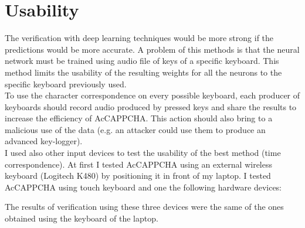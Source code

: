 \section{Usability}
The verification with deep learning techniques would be more strong if the predictions would be more accurate. A problem of this methods is that the neural network must be trained using audio file of keys of a specific keyboard. This method limits the usability of the resulting weights for all the neurons to the specific keyboard previously used. \\
To use the character correspondence on every possible keyboard, each producer of keyboards should record audio produced by pressed keys and share the results to increase the efficiency of AcCAPPCHA. This action should also bring to a malicious use of the data (e.g. an attacker could use them to produce an advanced key-logger).\\
I used also other input devices to test the usability of the best method (time correspondence). At first I tested AcCAPPCHA using an external wireless keyboard (Logitech K480) by positioning it in front of my laptop. I tested AcCAPPCHA using touch keyboard and one the following hardware devices:
\begin{itemize}
\end{itemize}
The results of verification using these three devices were the same of the ones obtained using the keyboard of the laptop.

